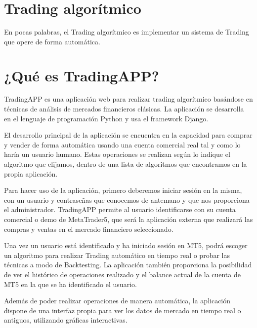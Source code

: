 \begin{titlepage}
\section{Trading algorítmico}

En pocas palabras, el Trading algorítmico es implementar un sistema de Trading que opere de forma automática.
	

\section{¿Qué es TradingAPP?}

TradingAPP es una aplicación web para realizar trading algorítmico basándose en técnicas de análisis de mercados financieros clásicas. La aplicación se desarrolla en el lenguaje de programación Python y usa el framework Django. \newline

El desarrollo principal de la aplicación se encuentra en la capacidad para comprar y vender de forma automática usando una cuenta comercial real tal y como lo haría un usuario humano. Estas operaciones se realizan según lo indique el algoritmo que elijamos, dentro de una lista de algoritmos que encontramos en la propia aplicación. \newline

Para hacer uso de la aplicación, primero deberemos iniciar sesión en la misma, con un usuario y contraseñas que conocemos de antemano y que nos proporciona el administrador. TradingAPP permite al usuario identificarse con su cuenta comercial o demo de MetaTrader5, que será la aplicación externa que realizará las compras y ventas en el mercado financiero seleccionado. \newline

Una vez un usuario está identificado y ha iniciado sesión en MT5, podrá escoger un algoritmo para realizar Trading automático en tiempo real o probar las técnicas a modo de Backtesting. La aplicación también proporciona la posibilidad de ver el histórico de operaciones realizado y el balance actual de la cuenta de MT5 en la que se ha identificado el usuario. \newline

Además de poder realizar operaciones de manera automática, la aplicación dispone de una interfaz propia para ver los datos de mercado en tiempo real o antiguos, utilizando gráficas interactivas.

\end{titlepage}
